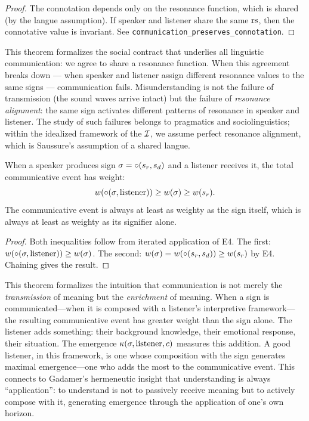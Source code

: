 \begin{proof}
The connotation depends only on the resonance function, which is
shared (by the langue assumption). If speaker and listener share
the same $\mathrm{rs}$, then the connotative value is invariant. See
\texttt{communication\_preserves\_connotation}.
\end{proof}

\begin{interpretation}
This theorem formalizes the social contract that underlies all
linguistic communication: we agree to share a resonance function.
When this agreement breaks down --- when speaker and listener assign
different resonance values to the same signs --- communication fails.
Misunderstanding is not the failure of transmission (the sound waves
arrive intact) but the failure of \emph{resonance alignment}: the
same sign activates different patterns of resonance in speaker and
listener. The study of such failures belongs to pragmatics and
sociolinguistics; within the idealized framework of the $\mathcal{I}$, we
assume perfect resonance alignment, which is Saussure's assumption
of a shared langue.
\end{interpretation}

\begin{theorem}
\label{thm:communicative-emergence}
When a speaker produces sign $\sigma = \circ(s_r, s_d)$ and a listener receives it, the total communicative event has weight:
\[
  w(\circ(\sigma, \text{listener})) \geq w(\sigma) \geq w(s_r).
\]
The communicative event is always at least as weighty as the sign itself, which is always at least as weighty as its signifier alone.
\end{theorem}

\begin{proof}
Both inequalities follow from iterated application of E4. The first: $w(\circ(\sigma, \text{listener})) \geq w(\sigma)$. The second: $w(\sigma) = w(\circ(s_r, s_d)) \geq w(s_r)$ by E4. Chaining gives the result.
\end{proof}

\begin{interpretation}
This theorem formalizes the intuition that communication is not merely the \emph{transmission} of meaning but the \emph{enrichment} of meaning. When a sign is communicated---when it is composed with a listener's interpretive framework---the resulting communicative event has greater weight than the sign alone. The listener adds something: their background knowledge, their emotional response, their situation. The emergence $\kappa(\sigma, \text{listener}, c)$ measures this addition. A good listener, in this framework, is one whose composition with the sign generates maximal emergence---one who adds the most to the communicative event. This connects to Gadamer's hermeneutic insight that understanding is always ``application'': to understand is not to passively receive meaning but to actively compose with it, generating emergence through the application of one's own horizon.
\end{interpretation}

